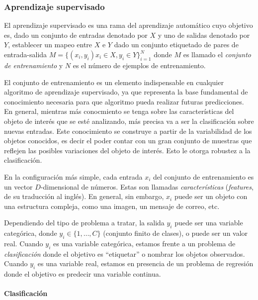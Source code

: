 	
	\subsubsection{Aprendizaje supervisado}
	
	El aprendizaje supervisado es una rama del aprendizaje automático cuyo objetivo es, dado un conjunto de entradas denotado por $X$ y uno de salidas denotado por $Y$, establecer un mapeo entre $X$ e $Y$ dado un conjunto etiquetado de pares de entrada-salida $M=\{(x_i,y_i) x_i \in X, y_i \in Y \}^{N}_{i=1}$ donde $M$ es llamado el \textit{conjunto de entrenamiento} y $N$ es el número de ejemplos de entrenamiento.
	
	El conjunto de entrenamiento es un elemento indispensable en cualquier algoritmo de aprendizaje supervisado, ya que representa la base fundamental de conocimiento necesaria para que algoritmo pueda realizar futuras predicciones. En general, mientras más conocmiento se tenga sobre las características del objeto de interés que se esté analizando, más precisa va a ser la clasificación sobre nuevas entradas. Este conocimiento se construye a partir de la variabilidad de los objetos conocidos, es decir el poder contar con un gran conjunto de muestras que reflejen las posibles variaciones del objeto de interés. Esto le otorga robustez a la clasificación.
	
	En la configuración más simple, cada entrada $x_i$ del conjunto de entrenamiento es un vector $D$-dimensional de números. Estas son llamadas \textit{características} (\textit{features}, de su traducción al inglés). En general, sin embargo, $x_i$ puede ser un objeto con una estructura compleja, como una imagen, un mensaje de correo, etc.
	
	Dependiendo del tipo de problema a tratar, la salida $y_i$ puede ser una variable categórica, donde $y_i \in \{1,\dots,C\}$ (conjunto finito de clases), o puede ser un valor real. Cuando $y_i$ es una variable categórica, estamos frente a un problema de \textit{clasificación} donde el objetivo es ``etiquetar'' o nombrar los objetos observados. Cuando $y_i$ es una variable real, estamos en presencia de un problema de regresión donde el objetivo es predecir una variable continua.
	
	
	\paragraph{Clasificación}  ~\\
	
